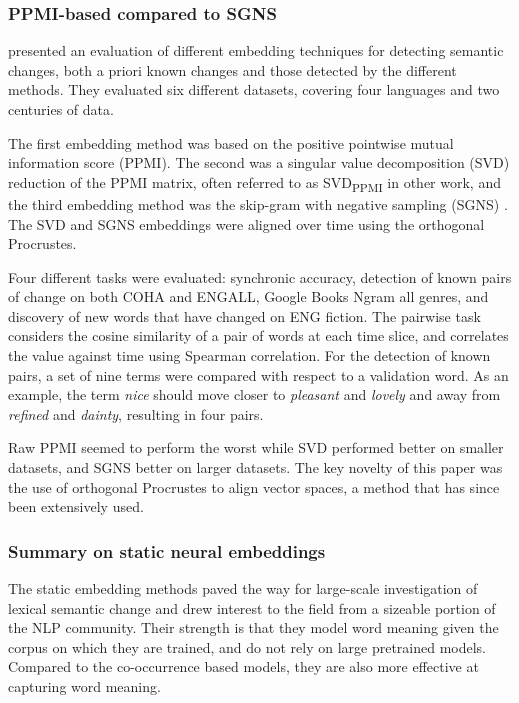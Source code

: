 \documentclass[output=paper]{langsci/langscibook}
\begin{document}
\subsubsection{PPMI-based compared to SGNS}      
\citet{hamilton-etal-2016-diachronic} presented an evaluation of different embedding techniques for detecting semantic changes, both a priori known changes and those detected by the different methods. 
They evaluated six different datasets, covering four languages and two centuries of data. 

The first embedding method was based on the positive pointwise mutual information score (PPMI). The second was a singular value decomposition (SVD) reduction of the PPMI matrix, often referred to as SVD\textsubscript{PPMI} in other work, and the third embedding method was the skip-gram with negative sampling (SGNS) \citep{mikolov2013-distributed}.
The SVD and SGNS embeddings were aligned over time using the orthogonal Procrustes.

Four different tasks were evaluated: synchronic accuracy, detection of known pairs of change on both COHA and ENGALL, Google Books Ngram all genres, and discovery of new words that have changed on ENG fiction.  
The pairwise task considers the cosine similarity of a pair of words at each time slice, and correlates the value against time using Spearman correlation. 
For the detection of known pairs, a set of nine terms were compared with respect to a validation word. As an example, the term \textit{nice} should move closer to \textit{pleasant} and \textit{lovely} and away from \textit{refined} and \textit{dainty}, resulting in four pairs. 

\begin{sloppypar}
Raw PPMI seemed to perform the worst while SVD performed better on smaller datasets, and SGNS better on larger datasets. The key novelty of this paper was the use of orthogonal Procrustes to align vector spaces, a method that has since been extensively used. 
\end{sloppypar}


\subsubsection{Summary on static neural embeddings}The static embedding methods paved the way for large-scale investigation of lexical semantic change and drew interest to the field from a sizeable portion of the NLP community. Their strength is that they model word meaning given the corpus on which they are trained, and do not rely on large pretrained models. Compared to the co-occurrence based models, they are also more effective at capturing word meaning.  
\end{document}
